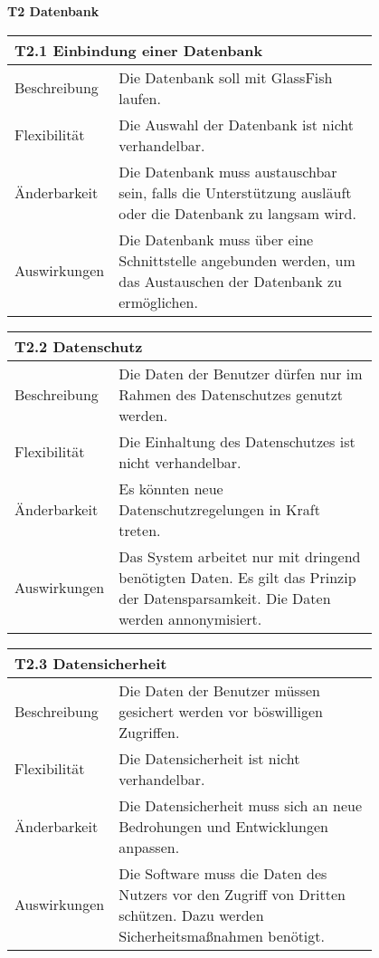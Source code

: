 {\begin{flushleft}
\textbf{T2  Datenbank}
\end{flushleft}
\centering
\begin{tabular}{|l|p{0.8\linewidth}|}
\hline
\multicolumn{2}{|l|}{\textbf{T2.1 Einbindung einer Datenbank}}
  \tabularnewline \hline
Beschreibung                                               &  Die Datenbank soll mit GlassFish laufen.                                               \tabularnewline \hline
Flexibilität                                              & Die Auswahl der Datenbank ist nicht verhandelbar.                                                                                \tabularnewline \hline
Änderbarkeit                                         &  Die Datenbank muss austauschbar sein, falls die Unterstützung ausläuft oder die Datenbank zu langsam wird. \tabularnewline \hline
Auswirkungen                                                & Die Datenbank muss über eine Schnittstelle angebunden werden, um das Austauschen der Datenbank zu ermöglichen.               \tabularnewline \hline
 \hline
\end{tabular}

\centering
\begin{tabular}{|l|p{0.8\linewidth}|}
\hline
\multicolumn{2}{|l|}{\textbf{T2.2 Datenschutz}}
  \tabularnewline \hline
Beschreibung                                               &  Die Daten der Benutzer dürfen nur im Rahmen des Datenschutzes genutzt werden.                                                 \tabularnewline \hline
Flexibilität                                              & Die Einhaltung des Datenschutzes ist nicht verhandelbar. \tabularnewline \hline
Änderbarkeit                                         & Es könnten neue Datenschutzregelungen in Kraft treten. \tabularnewline \hline
Auswirkungen                                                & Das System arbeitet nur mit dringend benötigten Daten. Es gilt das Prinzip der Datensparsamkeit. Die Daten werden annonymisiert.                                  \tabularnewline \hline
 \hline
\end{tabular}

\centering
\begin{tabular}{|l|p{0.8\linewidth}|}
\hline
\multicolumn{2}{|l|}{\textbf{T2.3 Datensicherheit}}
  \tabularnewline \hline
Beschreibung                                               &  Die Daten der Benutzer müssen gesichert werden vor böswilligen Zugriffen.                                                 \tabularnewline \hline
Flexibilität                                              & Die Datensicherheit ist nicht verhandelbar.                                                                                \tabularnewline \hline
Änderbarkeit                                         & Die Datensicherheit muss sich an neue Bedrohungen und Entwicklungen anpassen.                                                        \tabularnewline \hline
Auswirkungen                                                & Die Software muss die Daten des Nutzers vor den Zugriff von Dritten schützen. Dazu werden Sicherheitsmaßnahmen benötigt. \tabularnewline \hline
 \hline
\end{tabular}

}
